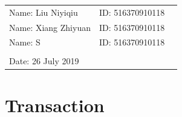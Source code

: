 \documentclass[12pt,a4paper]{article}
\begin{document}
\vspace*{0.25cm}

\hrulefill

\thispagestyle{empty}

\begin{center}
\begin{large}
\end{large}

\hrulefill

\vspace*{5cm}
\begin{Large}
\end{Large}

\vspace{2em}

\begin{large}
\end{large}
\end{center}


\vfill

\begin{table}[h!]
\flushleft
\begin{tabular}{lll}
Name: Liu Niyiqiu \hspace*{2em}&
ID: 516370910118\hspace*{2em}
\\
Name: Xiang Zhiyuan \hspace*{2em}&
ID: 516370910118\hspace*{2em}
\\
Name: S \hspace*{2em}&
ID: 516370910118\hspace*{2em}
\\


\\

Date: 26 July 2019
\end{tabular}
\end{table}

\hfill

\newpage
\tableofcontents
\newpage
\section{Transaction}
\end{document}
